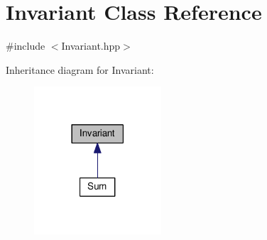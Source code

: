 \hypertarget{class_invariant}{\section{Invariant Class Reference}
\label{class_invariant}
}


{\ttfamily \#include $<$Invariant.\-hpp$>$}



Inheritance diagram for Invariant\-:\nopagebreak
\begin{figure}[H]
\begin{center}
\leavevmode
\includegraphics[width=134pt]{class_invariant__inherit__graph}
\end{center}
\end{figure}
